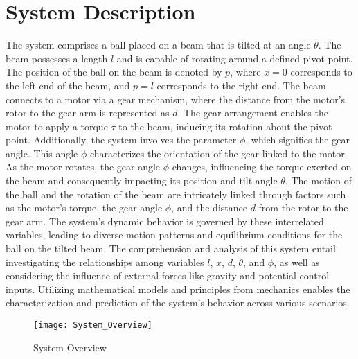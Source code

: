 \chapter{System Description}
The system comprises a ball placed on a beam that is tilted at an angle $\theta$.
The beam possesses a length $l$ and is capable of rotating around a defined pivot point.
The position of the ball on the beam is denoted by $p$, where $x = 0$ corresponds to the left end of the beam,
and $p = l$ corresponds to the right end.
The beam connects to a motor via a gear mechanism, where the distance from the motor's rotor to the gear arm is represented as $d$. The gear arrangement enables the motor to apply a torque $\tau$ to the beam, inducing its rotation about the pivot point.
Additionally, the system involves the parameter $\phi$, which signifies the gear angle.
This angle $\phi$ characterizes the orientation of the gear linked to the motor. As the motor rotates,
the gear angle $\phi$ changes, influencing the torque exerted on the beam and consequently impacting its position and tilt angle $\theta$.
The motion of the ball and the rotation of the beam are intricately linked through factors such as the motor's torque,
the gear angle $\phi$, and the distance $d$ from the rotor to the gear arm.
The system's dynamic behavior is governed by these interrelated variables,
leading to diverse motion patterns and equilibrium conditions for the ball on the tilted beam.
The comprehension and analysis of this system entail investigating the relationships among variables $l$, $x$, $d$, $\theta$, and $\phi$, as well as considering the influence of external forces like gravity and potential control inputs.
Utilizing mathematical models and principles from mechanics enables the characterization and prediction of the system's behavior across various scenarios.
\begin{figure}[ht]
	\centering
	\texttt{[image: System\_Overview]}
	\caption{System Overview}
\end{figure}
